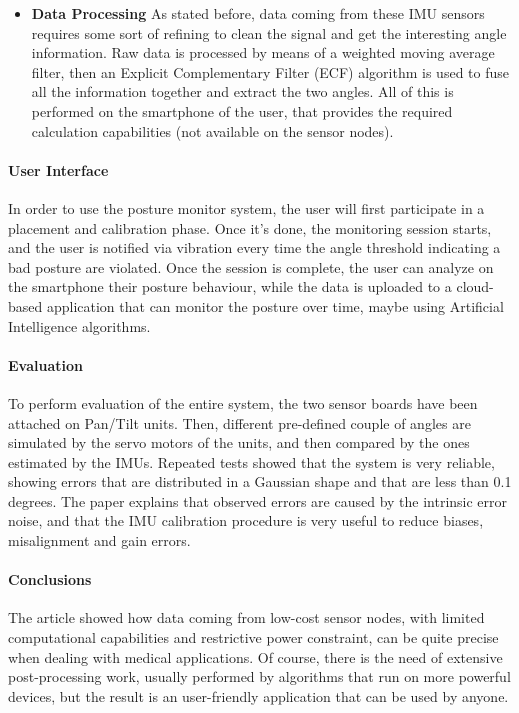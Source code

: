 \begin{itemize}
    \item \textbf{Data Processing} As stated before, data coming from these IMU sensors requires some sort of refining to clean the signal and get the interesting angle information. Raw data is processed by means of a weighted moving average filter, then an Explicit Complementary Filter (ECF) algorithm is used to fuse all the information together and extract the two angles. All of this is performed on the smartphone of the user, that provides the required calculation capabilities (not available on the sensor nodes). 
\end{itemize}

\paragraph{User Interface} In order to use the posture monitor system, the user will first participate in a placement and calibration phase. Once it's done, the monitoring session starts, and the user is notified via vibration every time the angle threshold indicating a bad posture are violated. Once the session is complete, the user can analyze on the smartphone their posture behaviour, while the data is uploaded to a cloud-based application that can monitor the posture over time, maybe using Artificial Intelligence algorithms. 

\paragraph{Evaluation} To perform evaluation of the entire system, the two sensor boards have been attached on Pan/Tilt units. Then, different pre-defined couple of angles are simulated by the servo motors of the units, and then compared by the ones estimated by the IMUs. Repeated tests showed that the system is very reliable, showing errors that are distributed in a Gaussian shape and that are less than 0.1 degrees. The paper explains that observed errors are caused by the intrinsic error noise, and that the IMU calibration procedure is very useful to reduce biases, misalignment and gain errors. 

\paragraph{Conclusions} The article showed how data coming from low-cost sensor nodes, with limited computational capabilities and restrictive power constraint, can be quite precise when dealing with medical applications. Of course, there is the need of extensive post-processing work, usually performed by algorithms that run on more powerful devices, but the result is an user-friendly application that can be used by anyone.  